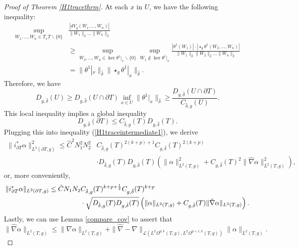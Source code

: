 \documentclass[11pt]{article}
\begin{document}
\begin{proof}[Proof of Theorem \ref{H1tracethrm}]
At each $x$ in $U$, we have the following inequality:
\begin{align*}
\sup_{W_1,\dots,W_n \in T_xT\backslash\{0\}}&\frac{|dV_{g}(W_1,\dots,W_n)|}{\|W_1\|_{\hat \delta}\dots\|W_n\|_{\hat \delta}} \\&\ge \sup_{W_2,\dots,W_n \in \ker \theta^1|_x\backslash\{0\}}\sup_{W_1 \notin \ker \theta^1|_x}\frac{|\theta^1(W_1)| \cdot |\star_g\theta^1(W_2,\dots,W_n)|}{\|W_1\|_{\hat \delta}\|W_2\|_{\hat \delta} \dots\|W_n\|_{\hat \delta}}\\
&= \|\theta^1|_x\|_{\hat \delta}\|\star_g\theta^1|_x\|_{\hat \delta}.
\end{align*}
Therefore, we have
\[
D_{g,\hat \delta}(U) \ge D_{g,\hat \delta}(U \cap \partial T)\inf_{x \in U}\|\theta^1|_x\|_{\hat \delta}  \ge \frac{D_{g,\hat \delta}(U \cap \partial T)}{C_{\hat \delta,g}(U)}. 
\]
This local inequality implies a global inequality
\[
D_{g,\hat \delta}(\partial T) \le C_{\hat \delta,g}(T)D_{g,\hat \delta}(T).
\]
Plugging this into inequality (\ref{H1traceintermediate1}), we derive
\begin{align*}
\|i_{\partial T}^*\alpha\|_{L^2(\partial T,g)}^2 \le \hat C^2 N_1^2N_2^2 &C_{\hat \delta,g}(T)^{2(k+p) + 1}C_{g,\hat \delta}(T)^{2(k+p)} \\&\cdot D_{\hat \delta,g}(T)D_{g,\hat \delta}(T)\left(\|\alpha\|_{L^2(T,g)}^2 + C_{g,\hat \delta}(T)^2\|\hat\nabla\alpha\|_{L^2(T,g)}^2\right),
\end{align*}
or, more conveniently,
\begin{align}
\|i_{\partial T}^*\alpha\|_{L^2(\partial T,g)} \le \hat C N_1N_2 & C_{\hat \delta,g}(T)^{k+p + \frac{1}{2}}C_{g,\hat \delta}(T)^{k+p} \notag \\
&\cdot \sqrt{D_{\hat \delta,g}(T)D_{g,\hat \delta}(T)}\left(\|\alpha\|_{L^2(T,g)} + C_{g,\hat \delta}(T)\|\hat\nabla\alpha\|_{L^2(T,g)}\right).\label{tracebounds}
\end{align}
Lastly, we can use Lemma \ref{compare_cov} to assert that 
\[
\|\hat\nabla \alpha\|_{L^2(T,g)} \le \|\nabla\alpha\|_{L^2(T,g)} + \|\hat\nabla - \nabla\|_{\mathcal{L}(L^2\Omega^{p,k}(T,g),L^2\Omega^{p+1,k}(T,g))}\|\alpha\|_{L^2(T,g)}
.\]


\end{proof}
\end{document}
